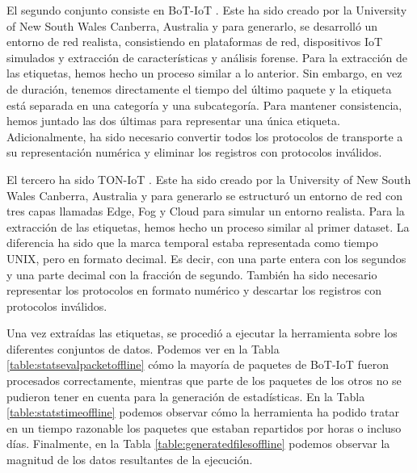 \documentclass[10pt,a4paper,twoside]{article}
\begin{document}
\begin{multicols}{2}
    El segundo conjunto consiste en BoT-IoT \cite{DBLP:journals/corr/abs-1811-00701}. Este ha sido creado por la University of New South Wales Canberra, Australia y para generarlo, se desarrolló un entorno de red realista, consistiendo en plataformas de red, dispositivos IoT simulados y extracción de características y análisis forense. Para la extracción de las etiquetas, hemos hecho un proceso similar a lo anterior. Sin embargo, en vez de duración, tenemos directamente el tiempo del último paquete y la etiqueta está separada en una categoría y una subcategoría. Para mantener consistencia, hemos juntado las dos últimas para representar una única etiqueta. Adicionalmente, ha sido necesario convertir todos los protocolos de transporte a su representación numérica y eliminar los registros con protocolos inválidos.
    
    El tercero ha sido TON-IoT \cite{MOUSTAFA2021102994}. Este ha sido creado por la University of New South Wales Canberra, Australia y para generarlo se estructuró un entorno de red con tres capas llamadas Edge, Fog y Cloud para simular un entorno realista. Para la extracción de las etiquetas, hemos hecho un proceso similar al primer dataset. La diferencia ha sido que la marca temporal estaba representada como tiempo UNIX, pero en formato decimal. Es decir, con una parte entera con los segundos y una parte decimal con la fracción de segundo. También ha sido necesario representar los protocolos en formato numérico y descartar los registros con protocolos inválidos.

    Una vez extraídas las etiquetas, se procedió a ejecutar la herramienta sobre los diferentes conjuntos de datos. Podemos ver en la Tabla \ref{table:statsevalpacketoffline} cómo la mayoría de paquetes de BoT-IoT fueron procesados correctamente, mientras que parte de los paquetes de los otros no se pudieron tener en cuenta para la generación de estadísticas. En la Tabla \ref{table:statstimeoffline} podemos observar cómo la herramienta ha podido tratar en un tiempo razonable los paquetes que estaban repartidos por horas o incluso días. Finalmente, en la Tabla \ref{table:generatedfilesoffline} podemos observar la magnitud de los datos resultantes de la ejecución.

    \begin{table}[H]
        \begin{center}
        \end{center}
        \caption{Paquetes procesados y válidos en el análisis}
        \label{table:statsevalpacketoffline}
    \end{table}


\end{multicols}
\end{document}
